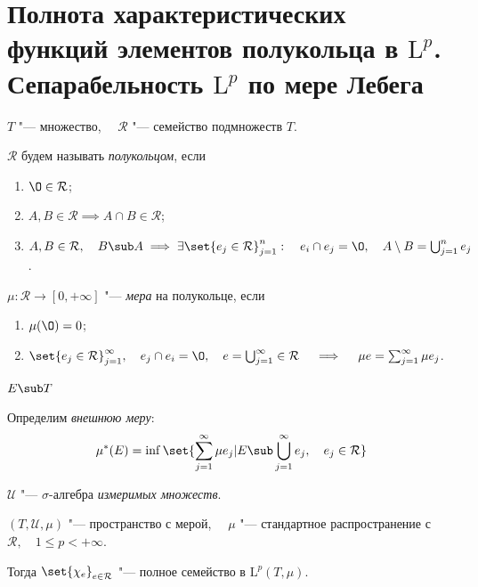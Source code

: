 \section{Полнота характеристических функций элементов полукольца в
\texorpdfstring{$ \mathrm L^p $}{пространствах Лебега}.
Сепарабельность \texorpdfstring{$ \mathrm L^p $}{пространств Лебега} по мере Лебега}

\begin{definition}
	$ T $ "--- множество, $ \quad \mathcal R $ "--- семейство подмножеств $ T $.

	$ \mathcal R $ будем называть \emph{полукольцом}, если
	\begin{enumerate}
		\item $ \O \in \mathcal R $;
		\item $ A, B \in \mathcal R \implies A \cap B \in \mathcal R $;
		\item $ A, B \in \mathcal R, \quad B \sub A \implies
			\exists \set{e_j \in \mathcal R}_{j = 1}^n : \quad
			e_i \cap e_j = \O, \quad A \setminus B = \bigcup_{j = 1}^n e_j $.
	\end{enumerate}
\end{definition}

\begin{definition}
	$ \mu : \mathcal R \to [0, +\infty] $ "--- \emph{мера} на полукольце, если
	\begin{enumerate}
		\item $ \mu(\O) = 0 $;
		\item $ \set{e_j \in \mathcal R}_{j = 1}^\infty, \quad e_j \cap e_i = \O, \quad
			e = \bigcup_{j = 1}^\infty \in \mathcal R \quad \implies \quad
			\mu e = \sum_{j = 1}^\infty \mu e_j $.
	\end{enumerate}
\end{definition}

\begin{definition}
	$ E \sub T $

	Определим \emph{внешнюю меру}:
	$$ \mu^*(E) = \inf \set{\sum_{j = 1}^\infty \mu e_j | E \sub \bigcup_{j = 1}^\infty e_j, \quad e_j \in \mathcal R} $$

	$ \mathcal U $ "--- $ \sigma $-алгебра \emph{измеримых множеств}.
\end{definition}

\begin{theorem}
	$ (T, \mathcal U, \mu) $ "--- пространство с мерой, $ \quad \mu $ "--- стандартное
	распространение с $ \mathcal R, \quad 1 \le p < +\infty $.

	Тогда $ \set{\chi_e}_{e \in \mathcal R} $ "--- полное семейство в $ \mathrm L^p(T, \mu) $.
\end{theorem}

